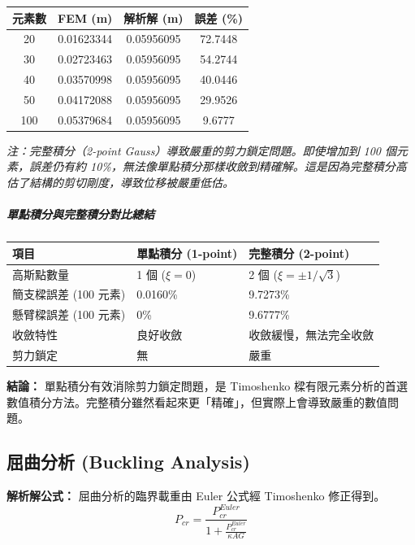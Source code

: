 \documentclass[UTF8, a4paper, 12pt]{ctexart}
\begin{document}
\begin{center}
\begin{tabular}{cccc}
\toprule
\textbf{元素數} & \textbf{FEM (m)} & \textbf{解析解 (m)} & \textbf{誤差 (\%)} \\
\midrule
20 & 0.01623344 & 0.05956095 & 72.7448 \\
30 & 0.02723463 & 0.05956095 & 54.2744 \\
40 & 0.03570998 & 0.05956095 & 40.0446 \\
50 & 0.04172088 & 0.05956095 & 29.9526 \\
100 & 0.05379684 & 0.05956095 & 9.6777 \\
\bottomrule
\end{tabular}
\end{center}

\textit{注：完整積分（2-point Gauss）導致嚴重的剪力鎖定問題。即使增加到 100 個元素，誤差仍有約 10\%，無法像單點積分那樣收斂到精確解。這是因為完整積分高估了結構的剪切剛度，導致位移被嚴重低估。}

\subparagraph{單點積分與完整積分對比總結}

\begin{center}
\begin{tabular}{p{2.5cm}p{4cm}p{4cm}}
\toprule
\textbf{項目} & \textbf{單點積分 (1-point)} & \textbf{完整積分 (2-point)} \\
\midrule
高斯點數量 & 1 個 ($\xi = 0$) & 2 個 ($\xi = \pm 1/\sqrt{3}$) \\
\midrule
簡支樑誤差 (100 元素) & 0.0160\% & 9.7273\% \\
\midrule
懸臂樑誤差 (100 元素) & 0\% & 9.6777\% \\
\midrule
收斂特性 & 良好收斂 & 收斂緩慢，無法完全收斂 \\
\midrule
剪力鎖定 & 無 & 嚴重 \\
\bottomrule
\end{tabular}
\end{center}

\textbf{結論：} 單點積分有效消除剪力鎖定問題，是 Timoshenko 樑有限元素分析的首選數值積分方法。完整積分雖然看起來更「精確」，但實際上會導致嚴重的數值問題。

\subsection{屈曲分析 (Buckling Analysis)}

\textbf{解析解公式：}
屈曲分析的臨界載重由 Euler 公式經 Timoshenko 修正得到。
\begin{equation}
  P_{cr} = \frac{P_{cr}^{Euler}}{1 + \frac{P_{cr}^{Euler}}{\kappa AG}}
\end{equation}
\end{document}
